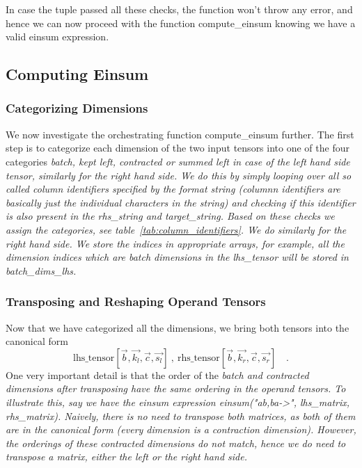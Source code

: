 \documentclass[sigconf]{acmart}
\renewcommand{\texttt}[1]{\begingroup\ttfamily\sloppy\hbadness=10000 #1\endgroup}
\begin{document}
\noindent
In case the tuple passed all these checks, the function won't throw any error, and hence we can now proceed with the function \texttt{compute\_einsum} knowing we have a valid einsum expression.


\subsection{Computing Einsum}
\subsubsection{Categorizing Dimensions}
We now investigate the orchestrating function \texttt{compute\_einsum} further.
The first step is to categorize each dimension of the two input tensors into one of the four categories \em batch, kept left, contracted \em or \em summed left \em in case of the left hand side tensor, similarly for the right hand side. We do this by simply looping over all so called \em column identifiers \em specified by the format string (columnn identifiers are basically just the individual characters in the string) and checking if this identifier is also present in the \texttt{rhs\_string} and \texttt{target\_string}. Based on these checks we assign the categories, see table~\ref{tab:column_identifiers}. We do similarly for the right hand side. We store the indices in appropriate arrays, for example, all the dimension indices which are batch dimensions in the \texttt{lhs\_tensor} will be stored in \texttt{batch\_dims\_lhs}.

\subsubsection{Transposing and Reshaping Operand Tensors}
Now that we have categorized all the dimensions, we bring both tensors into the canonical form
\[ \text{lhs\_tensor}[\vec{b}, \vec{k_l}, \vec{c}, \vec{s_l}] \ , \ \text{rhs\_tensor}[\vec{b}, \vec{k_r}, \vec{c}, \vec{s_r}] \quad . \]
One very important detail is that the order of the \em batch \em and \em contracted \em dimensions after transposing have the same ordering in the operand tensors. To illustrate this, say we have the einsum expression \texttt{einsum("ab,ba->", lhs\_matrix, rhs\_matrix)}. Naively, there is no need to transpose both matrices, as both of them are in the canonical form (every dimension is a contraction dimension). However, the orderings of these contracted dimensions do not match, hence we do need to transpose a matrix, either the left or the right hand side.
\end{document}
